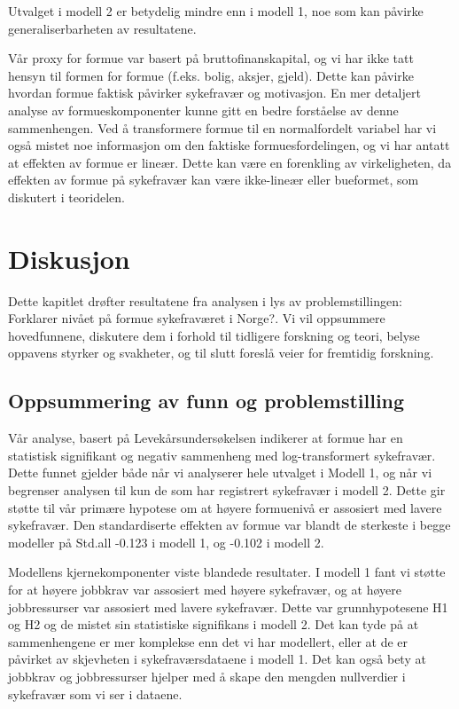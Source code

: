 \documentclass[
  12pt,
  a4paper,
  DIV=11,
  numbers=noendperiod]{scrartcl}
\begin{document}
Utvalget i modell 2 er betydelig mindre enn i modell 1, noe som kan
påvirke generaliserbarheten av resultatene.

Vår proxy for formue var basert på bruttofinanskapital, og vi har ikke
tatt hensyn til formen for formue (f.eks. bolig, aksjer, gjeld). Dette
kan påvirke hvordan formue faktisk påvirker sykefravær og motivasjon. En
mer detaljert analyse av formueskomponenter kunne gitt en bedre
forståelse av denne sammenhengen. Ved å transformere formue til en
normalfordelt variabel har vi også mistet noe informasjon om den
faktiske formuesfordelingen, og vi har antatt at effekten av formue er
lineær. Dette kan være en forenkling av virkeligheten, da effekten av
formue på sykefravær kan være ikke-lineær eller bueformet, som diskutert
i teoridelen.

\newpage

\section{Diskusjon}\label{sec-diskusjon}

Dette kapitlet drøfter resultatene fra analysen i lys av
problemstillingen: Forklarer nivået på formue sykefraværet i Norge?. Vi
vil oppsummere hovedfunnene, diskutere dem i forhold til tidligere
forskning og teori, belyse oppavens styrker og svakheter, og til slutt
foreslå veier for fremtidig forskning.

\subsection{Oppsummering av funn og
problemstilling}\label{oppsummering-av-funn-og-problemstilling}

Vår analyse, basert på Levekårsundersøkelsen indikerer at formue har en
statistisk signifikant og negativ sammenheng med log-transformert
sykefravær. Dette funnet gjelder både når vi analyserer hele utvalget i
Modell 1, og når vi begrenser analysen til kun de som har registrert
sykefravær i modell 2. Dette gir støtte til vår primære hypotese om at
høyere formuenivå er assosiert med lavere sykefravær. Den standardiserte
effekten av formue var blandt de sterkeste i begge modeller på Std.all
-0.123 i modell 1, og -0.102 i modell 2.

Modellens kjernekomponenter viste blandede resultater. I modell 1 fant
vi støtte for at høyere jobbkrav var assosiert med høyere sykefravær, og
at høyere jobbressurser var assosiert med lavere sykefravær. Dette var
grunnhypotesene H1 og H2 og de mistet sin statistiske signifikans i
modell 2. Det kan tyde på at sammenhengene er mer komplekse enn det vi
har modellert, eller at de er påvirket av skjevheten i
sykefraværsdataene i modell 1. Det kan også bety at jobbkrav og
jobbressurser hjelper med å skape den mengden nullverdier i sykefravær
som vi ser i dataene.
\end{document}
